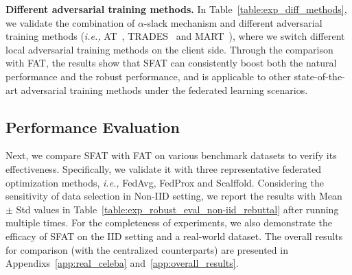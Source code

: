 \documentclass{article} %
\theoremstyle{plain}
\theoremstyle{definition}
\theoremstyle{remark}
\begin{document}
\textbf{Different adversarial training methods.} In Table~\ref{table:exp_diff_methods}, we validate the combination of $\alpha$-slack mechanism and different adversarial training methods (\textit{i.e.,} AT~\citep{Madry_adversarial_training}, TRADES~\citep{Zhang_trades} and MART~\citep{wang2020improving_MART}), where we switch different local adversarial training methods on the client side. Through the comparison with FAT, the results show that SFAT can consistently boost both the natural performance and the robust performance, and is applicable to other state-of-the-art adversarial training methods under the federated learning scenarios.

\subsection{Performance Evaluation}
\label{sec:exp_benchmark}


Next, we compare SFAT with FAT on various benchmark datasets to verify its effectiveness. Specifically, we validate it with three representative federated optimization methods, \textit{i.e.,} FedAvg, FedProx and Scalffold. Considering the sensitivity of data selection in Non-IID setting, we report the results with Mean $\pm$ Std values in Table~\ref{table:exp_robust_eval_non-iid_rebuttal} after running multiple times. For the completeness of experiments, we also demonstrate the efficacy of SFAT on the IID setting and a real-world dataset. The overall results for comparison (with the centralized counterparts) are presented in Appendixs~\ref{app:real_celeba} and~\ref{app:overall_results}.
\end{document}
